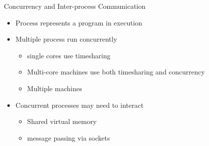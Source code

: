 \documentclass{report}
\begin{document}
\begin{description}
    \item Concurrency and Inter-process Communication
        \begin{itemize}
            \item Process represents a program in execution
            \item Multiple process run concurrently
                \begin{itemize}
                    \item single cores use timesharing
                    \item Multi-core machines use both timesharing and concurrency
                    \item Multiple machines
                \end{itemize}
            \item Concurrent processes may need to interact
                \begin{itemize}
                    \item Shared virtual memory
                    \item message passing via sockets
                \end{itemize}
        \end{itemize}
\end{description}
\end{document}
